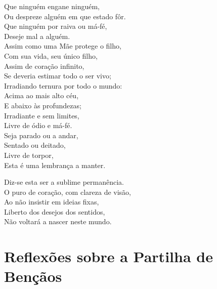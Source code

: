 \documentclass[
  babelLanguage=portuguese,
  final,
]{chantingbook}
\begin{document}
Que ninguém engane ninguém,\\
Ou despreze alguém em que estado fôr.\\
Que ninguém por raiva ou má-fé,\\
Deseje mal a alguém.\\
Assim como uma Mãe protege o filho,\\
Com sua vida, seu único filho,\\
Assim de coração infinito,\\
Se deveria estimar todo o ser vivo;\\
Irradiando ternura por todo o mundo:\\
Acima ao mais alto céu,\\
E abaixo às profundezas;\\
Irradiante e sem limites,\\
Livre de ódio e má-fé.\\
Seja parado ou a andar,\\
Sentado ou deitado,\\
Livre de torpor,\\
Esta é uma lembrança a manter.

Diz-se esta ser a sublime permanência.\\
O puro de coração, com clareza de visão,\\
Ao não insistir em ideias fixas,\\
Liberto dos desejos dos sentidos,\\
Não voltará a nascer neste mundo.

\chapter{Reflexões sobre a Partilha de Bençãos}

\begin{leader}
\end{leader}
\end{document}

